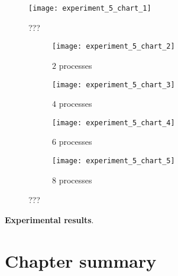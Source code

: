\begin{figure}[H]
  \centering
  \texttt{[image: experiment\_5\_chart\_1]}
  \caption{???}
  \label{fig:experiment:5}
\end{figure}

\begin{figure}[H]
     \begin{subfigure}[b]{0.49\textwidth}
         \centering
         \texttt{[image: experiment\_5\_chart\_2]}
         \caption{$2$ processes}
         \label{fig:experiment:6:subfigure:1}
     \end{subfigure}
     \begin{subfigure}[b]{0.49\textwidth}
         \centering
         \texttt{[image: experiment\_5\_chart\_3]}
         \caption{$4$ processes}
         \label{fig:experiment:6:subfigure:2}
     \end{subfigure}
     \begin{subfigure}[b]{0.49\textwidth}
         \centering
         \texttt{[image: experiment\_5\_chart\_4]}
         \caption{$6$ processes}
         \label{fig:experiment:6:subfigure:3}
     \end{subfigure}
     \begin{subfigure}[b]{0.49\textwidth}
         \centering
         \texttt{[image: experiment\_5\_chart\_5]}
         \caption{$8$ processes}
         \label{fig:experiment:6:subfigure:4}
     \end{subfigure}
     \caption{???}
     \label{fig:experiment:6}
\end{figure}

\textbf{Experimental results}.

\section{Chapter summary}
